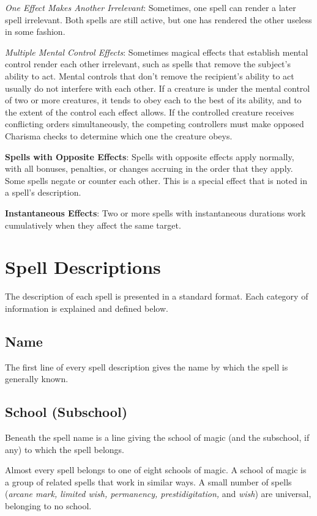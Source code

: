 \textit{One Effect Makes Another Irrelevant}: Sometimes, one spell can render a later spell irrelevant. Both spells are still active, but one has rendered the other useless in some fashion.
				
\textit{Multiple Mental Control Effects}: Sometimes magical effects that establish mental control render each other irrelevant, such as spells that remove the subject's ability to act. Mental controls that don't remove the recipient's ability to act usually do not interfere with each other. If a creature is under the mental control of two or more creatures, it tends to obey each to the best of its ability, and to the extent of the control each effect allows. If the controlled creature receives conflicting orders simultaneously, the competing controllers must make opposed Charisma checks to determine which one the creature obeys.
				
\textbf{Spells with Opposite Effects}: Spells with opposite effects apply normally, with all bonuses, penalties, or changes accruing in the order that they apply. Some spells negate or counter each other. This is a special effect that is noted in a spell's description. 
				
\textbf{Instantaneous Effects}: Two or more spells with instantaneous durations work cumulatively when they affect the same target.
				
\section{Spell Descriptions}

				
The description of each spell is presented in a standard format. Each category of information is explained and defined below.
				
\subsection{Name}

				
The first line of every spell description gives the name by which the spell is generally known.
				
\subsection{School (Subschool)}

				
Beneath the spell name is a line giving the school of magic (and the subschool, if any) to which the spell belongs.
				
Almost every spell belongs to one of eight schools of magic. A school of magic is a group of related spells that work in similar ways. A small number of spells (\textit{arcane mark, limited wish, permanency, prestidigitation, }and \textit{wish}) are universal, belonging to no school.
				
